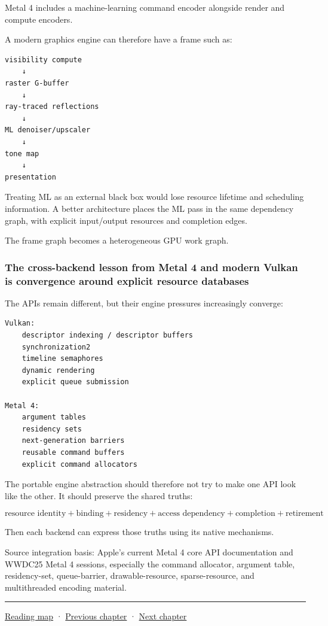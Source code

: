 Metal 4 includes a machine-learning command encoder alongside render and compute encoders.

A modern graphics engine can therefore have a frame such as:

\begin{verbatim}
visibility compute
    ↓
raster G-buffer
    ↓
ray-traced reflections
    ↓
ML denoiser/upscaler
    ↓
tone map
    ↓
presentation
\end{verbatim}

Treating ML as an external black box would lose resource lifetime and scheduling information. A better architecture places the ML pass in the same dependency graph, with explicit input/output resources and completion edges.

The frame graph becomes a heterogeneous GPU work graph.

\subsubsection{The cross-backend lesson from Metal 4 and modern Vulkan is convergence around explicit resource databases}\label{05-engine-i-ch022-the-cross-backend-lesson-from-metal-4-and-modern-vulkan-is-convergence-around-explicit-resource-databases}

The APIs remain different, but their engine pressures increasingly converge:

\begin{verbatim}
Vulkan:
    descriptor indexing / descriptor buffers
    synchronization2
    timeline semaphores
    dynamic rendering
    explicit queue submission

Metal 4:
    argument tables
    residency sets
    next-generation barriers
    reusable command buffers
    explicit command allocators
\end{verbatim}

The portable engine abstraction should therefore not try to make one API look like the other. It should preserve the shared truths:

\[
\boxed{
\text{resource identity}
+
\text{binding}
+
\text{residency}
+
\text{access dependency}
+
\text{completion}
+
\text{retirement}
}
\]

Then each backend can express those truths using its native mechanisms.

Source integration basis: Apple's current Metal 4 core API documentation and WWDC25 Metal 4 sessions, especially the command allocator, argument table, residency-set, queue-barrier, drawable-resource, sparse-resource, and multithreaded encoding material.

\begin{center}\rule{0.5\linewidth}{0.5pt}\end{center}

\hyperref[volume-reading-map]{Reading map} · \hyperref[05-engine-i-ch021]{Previous chapter} · \hyperref[05-engine-i-ch023]{Next chapter}
